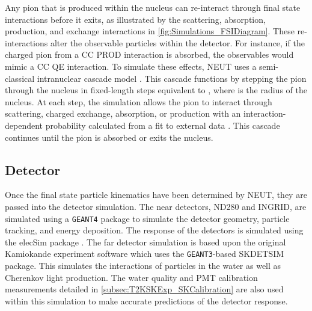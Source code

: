 Any pion that is produced within the nucleus can re-interact through final state interactions before it exits, as illustrated by the scattering, absorption, production, and exchange interactions in \autoref{fig:Simulations_FSIDiagram}. These re-interactions alter the observable particles within the detector. For instance, if the charged pion from a CC PROD interaction is absorbed, the observables would mimic a CC QE interaction. To simulate these effects, NEUT uses a semi-classical intranuclear cascade model \cite{Hayato2021}. This cascade functions by stepping the pion through the nucleus in fixed-length steps equivalent to , where  is the radius of the nucleus. At each step, the simulation allows the pion to interact through scattering, charged exchange, absorption, or production with an interaction-dependent probability calculated from a fit to external data \cite{PhysRevD.99.052007}. This cascade continues until the pion is absorbed or exits the nucleus.

\subsection{Detector}

Once the final state particle kinematics have been determined by NEUT, they are passed into the detector simulation. The near detectors, ND280 and INGRID, are simulated using a \texttt{GEANT4} package \cite{t2k_det,geant4} to simulate the detector geometry, particle tracking, and energy deposition. The response of the detectors is simulated using the elecSim package \cite{t2k_det}. The far detector simulation is based upon the original Kamiokande experiment software which uses the \texttt{GEANT3}-based SKDETSIM \cite{Brun:1987ma,t2k_det} package. This simulates the interactions of particles in the water as well as Cherenkov light production. The water quality and PMT calibration measurements detailed in \autoref{subsec:T2KSKExp_SKCalibration} are also used within this simulation to make accurate predictions of the detector response.


